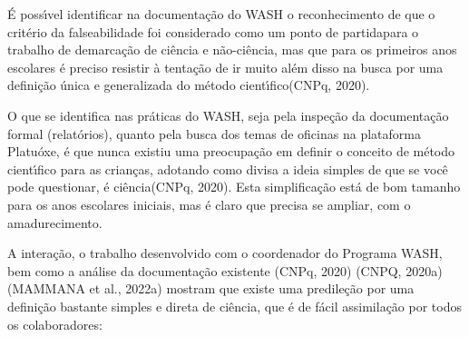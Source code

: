 \documentclass[
12pt,		%
openright,	%
twoside,  %
a4paper,			%
chapter=TITLE,		%
english,			%
french,				%
spanish,			%
brazil				%
]{USPSC-classe/USPSC}
\begin{document}
\noindent\begin{center}\mbox{\centering{}}\end{center}


\'E poss\'{\i}vel identificar na documenta\c{c}\~ao do WASH o reconhecimento de que o crit\'erio da falseabilidade foi considerado como um \textquotedbl ponto de partida\textquotedbl  para o trabalho de \textquotedbl demarca\c{c}\~ao de ci\^encia e n\~ao-ci\^encia\textquotedbl , mas que para \textquotedbl os primeiros anos escolares \'e preciso resistir \`a tenta\c{c}\~ao de ir muito al\'em disso na busca por uma defini\c{c}\~ao \'unica e generalizada do m\'etodo cient\'{\i}fico\textquotedbl  (CNPq, 2020).









O que se identifica nas pr\'aticas do WASH, seja pela inspe\c{c}\~ao da documenta\c{c}\~ao formal (relat\'orios), quanto pela busca dos temas de oficinas na plataforma \textquotedbl Platu\'oxe\textquotedbl , \'e que nunca existiu uma preocupa\c{c}\~ao em definir o conceito de m\'etodo cient\'{\i}fico para as crian\c{c}as, adotando como \textquotedbl divisa \textquotedbl  a ideia simples de que \textquotedbl se voc\^e pode questionar, \'e ci\^encia\textquotedbl  (CNPq, 2020). Esta simplifica\c{c}\~ao est\'a de bom tamanho para os anos escolares iniciais, mas \'e claro que precisa se ampliar, com o amadurecimento.









A intera\c{c}\~ao, o trabalho desenvolvido com o coordenador do Programa WASH, bem como a an\'alise da documenta\c{c}\~ao existente (CNPq, 2020)  (CNPQ, 2020a)  (MAMMANA et al., 2022a) mostram que existe uma predile\c{c}\~ao por uma defini\c{c}\~ao bastante simples e direta de ci\^encia, que \'e de f\'acil assimila\c{c}\~ao por todos os colaboradores:
\end{document}

